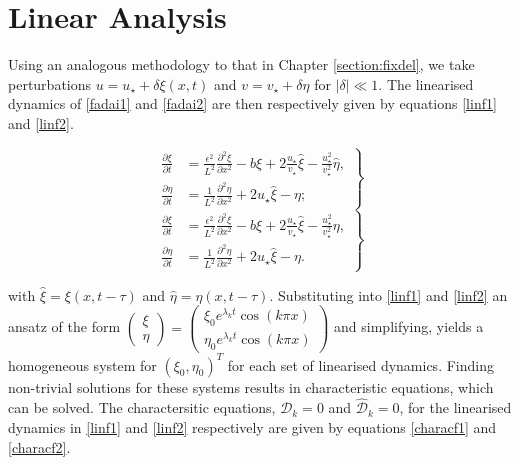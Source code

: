 \section{Linear Analysis}

Using an analogous methodology to that in Chapter \ref{section:fixdel}, we take perturbations $u=u_\star+\delta\xi(x,t)$ and $v=v_\star+\delta\eta$ for $|\delta|\ll1$. The linearised dynamics of \eqref{fadai1} and \eqref{fadai2} are then respectively given by equations \eqref{linf1} and \eqref{linf2}.

\begin{multicols}{2}
\begin{equation}\label{linf1}
    \left.\begin{split}
\frac{\partial \xi}{\partial t}&=\frac{\epsilon^2}{L^2}\frac{\partial^2 \xi}{\partial x^2}-b\xi+2\frac{u_\star}{v_\star}\hat{\xi}-\frac{u_\star^2}{v_\star^2}\hat{\eta},\\
\frac{\partial \eta}{\partial t}&=\frac{1}{L^2}\frac{\partial^2 \eta}{\partial x^2}+2u_\star\hat{\xi}-\eta;
\end{split}\right\}
\end{equation}\break
\begin{equation}
    \left.\begin{split}
\frac{\partial \xi}{\partial t}&=\frac{\epsilon^2}{L^2}\frac{\partial^2 \xi}{\partial x^2}-b\xi+2\frac{u_\star}{v_\star}\hat{\xi}-\frac{u_\star^2}{v_\star^2}\eta,\\
\frac{\partial \eta}{\partial t}&=\frac{1}{L^2}\frac{\partial^2 \eta}{\partial x^2}+2u_\star\hat{\xi}-\eta.\label{linf2}
\end{split}\right\}
\end{equation}
\end{multicols}
with $\hat{\xi}=\xi(x,t-\tau)$ and $\hat{\eta}=\eta(x,t-\tau)$. Substituting into \eqref{linf1} and \eqref{linf2} an ansatz of the form $\begin{pmatrix}\xi\\ \eta\end{pmatrix}=\begin{pmatrix}\xi_0e^{\lambda_kt}\cos(k\pi x)\\\eta_0e^{\lambda_kt}\cos(k\pi x)\end{pmatrix}$ and simplifying, yields a homogeneous system for $(\xi_0,\eta_0)^T$ for each set of linearised dynamics. Finding non-trivial solutions for these systems results in characteristic equations, which can be solved. The charactersitic equations, $\mathcal{D}_k=0$ and $\hat{\mathcal{D}}_k=0$, for the linearised dynamics in \eqref{linf1} and \eqref{linf2} respectively are given by equations \eqref{characf1} and \eqref{characf2}.
